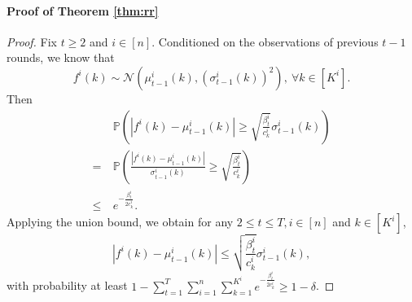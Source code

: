 \documentclass[letterpaper]{vldb}
\newcommand{\cN}{\mathcal{N}}
\newcommand{\bP}{\mathbb{P}} %
\begin{document}
\vspace{2em}
\paragraph*{Proof of Theorem \ref{thm:rr}}
\begin{proof}
   Fix $t\ge 2$ and $i\in [n]$. Conditioned on the observations of previous $t-1$ rounds, we
  know that 
  \[
    f^i(k) \sim \cN(\mu^i_{t-1}(k), (\sigma^i_{t-1}(k))^2), \ \forall k\in [K^i].
  \]
  Then
  \begin{align*}
    & \bP\left(|f^i(k)- \mu^i_{t-1}(k)| \ge \sqrt{\frac{\beta^i_t}{c^i_k}}\sigma^i_{t-1}(k)\right)\\
    =\ & \bP\left(\frac{|f^i(k)- \mu^i_{t-1}(k)|}{\sigma^i_{t-1}(k)} \ge \sqrt{\frac{\beta^i_t}{c^i_k}}\right)\\
     \le\ & e^{-\frac{\beta^i_t}{2c^i_k}}.
  \end{align*}
  Applying the union bound, we obtain for any $2\le t\le T, i\in [n]$ and $k\in [K^i]$,
  \[
    |f^i(k) - \mu^i_{t-1}(k) | \le \sqrt{\frac{\beta^i_t}{c^i_k}}\sigma^i_{t-1}(k),
  \]
  with probability at least $1- \sum_{t=1}^T\sum_{i=1}^n\sum_{k=1}^{K^i}
  e^{-\frac{\beta^i_t}{2c^i_k}} \ge  1 - \delta$.


\end{proof}
\end{document}
